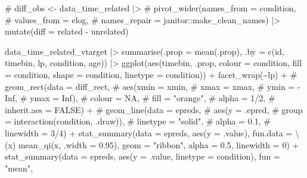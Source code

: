 \documentclass[
  letterpaper,
  DIV=11,
  numbers=noendperiod]{scrartcl}
\newenvironment{Shaded}{\begin{snugshade}}{\end{snugshade}}
\newcommand{\AttributeTok}[1]{\textcolor[rgb]{0.40,0.45,0.13}{#1}}
\newcommand{\CommentTok}[1]{\textcolor[rgb]{0.37,0.37,0.37}{#1}}
\newcommand{\DecValTok}[1]{\textcolor[rgb]{0.68,0.00,0.00}{#1}}
\newcommand{\FloatTok}[1]{\textcolor[rgb]{0.68,0.00,0.00}{#1}}
\newcommand{\FunctionTok}[1]{\textcolor[rgb]{0.28,0.35,0.67}{#1}}
\newcommand{\NormalTok}[1]{\textcolor[rgb]{0.00,0.23,0.31}{#1}}
\newcommand{\SpecialCharTok}[1]{\textcolor[rgb]{0.37,0.37,0.37}{#1}}
\newcommand{\StringTok}[1]{\textcolor[rgb]{0.13,0.47,0.30}{#1}}
\begin{document}
\begin{Shaded}
\begin{Highlighting}[]
\CommentTok{\# diff\_obs \textless{}{-} data\_time\_related |\textgreater{}}
\CommentTok{\#   pivot\_wider(names\_from = condition, }
\CommentTok{\#               values\_from = elog,}
\CommentTok{\#               names\_repair = janitor::make\_clean\_names) |\textgreater{} mutate(diff = related {-} unrelated)}

\NormalTok{data\_time\_related\_vtarget }\SpecialCharTok{|\textgreater{}} 
    \FunctionTok{summarise}\NormalTok{(}\AttributeTok{.prop =} \FunctionTok{mean}\NormalTok{(.prop),}
              \AttributeTok{.by =} \FunctionTok{c}\NormalTok{(id, timebin, lp, condition, age)) }\SpecialCharTok{|\textgreater{}} 
    \FunctionTok{ggplot}\NormalTok{(}\FunctionTok{aes}\NormalTok{(timebin, .prop, }
               \AttributeTok{colour =}\NormalTok{ condition,}
               \AttributeTok{fill =}\NormalTok{ condition,}
               \AttributeTok{shape =}\NormalTok{ condition,}
               \AttributeTok{linetype =}\NormalTok{ condition)) }\SpecialCharTok{+}
    \FunctionTok{facet\_wrap}\NormalTok{(}\SpecialCharTok{\textasciitilde{}}\NormalTok{lp) }\SpecialCharTok{+}
    \CommentTok{\# geom\_rect(data = diff\_rect,}
    \CommentTok{\#         aes(xmin = xmin,}
    \CommentTok{\#           xmax = xmax,}
    \CommentTok{\#           ymin = {-}Inf,}
    \CommentTok{\#           ymax = Inf),}
    \CommentTok{\#         colour = NA,}
    \CommentTok{\#         fill = "orange",}
    \CommentTok{\#         alpha = 1/2,}
    \CommentTok{\#         inherit.aes = FALSE) +}
    \CommentTok{\# geom\_line(data = epreds,}
    \CommentTok{\#         aes(y = .epred,}
\CommentTok{\#           group = interaction(condition, .draw)),}
\CommentTok{\#         linetype = "solid",}
\CommentTok{\#         alpha = 0.1,}
\CommentTok{\#         linewidth = 3/4) +}
\FunctionTok{stat\_summary}\NormalTok{(}\AttributeTok{data =}\NormalTok{ epreds,}
             \FunctionTok{aes}\NormalTok{(}\AttributeTok{y =}\NormalTok{ .value),}
             \AttributeTok{fun.data =}\NormalTok{ \textbackslash{}(x) }\FunctionTok{mean\_qi}\NormalTok{(x, }\AttributeTok{.width =} \FloatTok{0.95}\NormalTok{),}
             \AttributeTok{geom =} \StringTok{"ribbon"}\NormalTok{,}
             \AttributeTok{alpha =} \FloatTok{0.5}\NormalTok{,}
             \AttributeTok{linewidth =} \DecValTok{0}\NormalTok{) }\SpecialCharTok{+}
    \FunctionTok{stat\_summary}\NormalTok{(}\AttributeTok{data =}\NormalTok{ epreds,}
                 \FunctionTok{aes}\NormalTok{(}\AttributeTok{y =}\NormalTok{ .value,}
                    \AttributeTok{linetype =}\NormalTok{ condition),}
                 \AttributeTok{fun =} \StringTok{"mean"}\NormalTok{,}

\end{Highlighting}
\end{Shaded}
\end{document}
